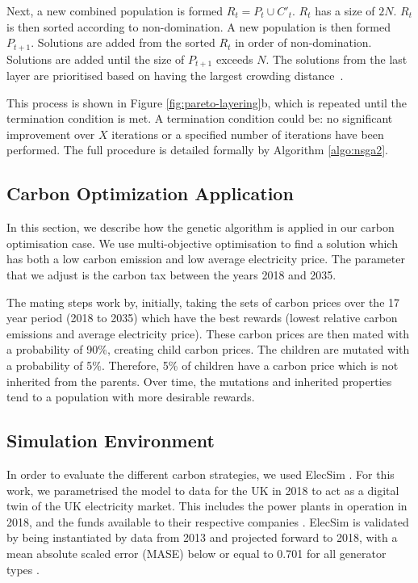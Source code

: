 Next, a new combined population is formed $R_{t}=P_{t} \cup C'_{t}$. $R_t$ has a size of $2N$. $R_t$ is then sorted according to non-domination. A new population is then formed $P_{t+1}$. Solutions are added from the sorted $R_t$ in order of non-domination. Solutions are added until the size of $P_{t+1}$ exceeds $N$. The solutions from the last layer are prioritised based on having the largest crowding distance~\cite{Valkanas2014}.

This process is shown in Figure \ref{fig:pareto-layering}b, which is repeated until the termination condition is met. A termination condition could be:  no significant improvement over $X$ iterations or a specified number of iterations have been performed. The full procedure is detailed formally by Algorithm \ref{algo:nsga2}.


\subsection{Carbon Optimization Application}

In this section, we describe how the genetic algorithm is applied in our carbon optimisation case. We use multi-objective optimisation to find a solution which has both a low carbon emission and low average electricity price. The parameter that we adjust is the carbon tax between the years 2018 and 2035.

The mating steps work by, initially, taking the sets of carbon prices over the 17 year period (2018 to 2035) which have the best rewards (lowest relative carbon emissions and average electricity price). These carbon prices are then mated with a probability of 90\%, creating child carbon prices. The children are mutated with a probability of 5\%. Therefore, 5\% of children have a carbon price which is not inherited from the parents. Over time, the mutations and inherited properties tend to a population with more desirable rewards.
















\subsection{Simulation Environment}
In order to evaluate the different carbon strategies, we used ElecSim \cite{Kell,Kell2020}. For this work, we parametrised the model to data for the UK in 2018 to act as a digital twin of the UK electricity market. This includes the power plants in operation in 2018, and the funds available to their respective companies \cite{dukes_511, companies_house}. ElecSim is validated by being instantiated by data from 2013 and projected forward to 2018, with a mean absolute scaled error (MASE) below or equal to 0.701 for all generator types \cite{Kell2020}. 

